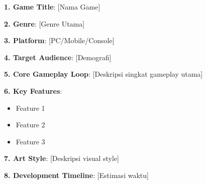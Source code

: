 \begin{contoh}
\textbf{1. Game Title}: [Nama Game]

\textbf{2. Genre}: [Genre Utama]

\textbf{3. Platform}: [PC/Mobile/Console]

\textbf{4. Target Audience}: [Demografi]

\textbf{5. Core Gameplay Loop}: [Deskripsi singkat gameplay utama]

\textbf{6. Key Features}: 
\begin{itemize}
\item Feature 1
\item Feature 2
\item Feature 3
\end{itemize}

\textbf{7. Art Style}: [Deskripsi visual style]

\textbf{8. Development Timeline}: [Estimasi waktu]
\end{contoh}
